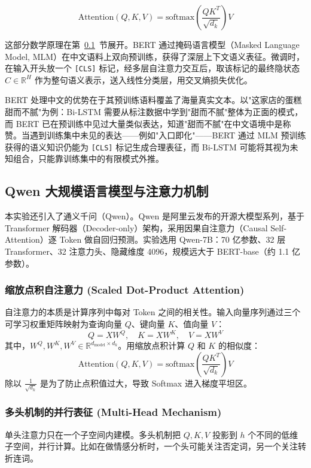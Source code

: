 \begin{equation}
	\text{Attention}(Q, K, V) = \text{softmax}\left(\frac{Q K^T}{\sqrt{d_k}}\right) V
\end{equation}

这部分数学原理在第~\ref{sec:mhsa_mechanism}~节展开。BERT 通过掩码语言模型（Masked Language Model, MLM）在中文语料上双向预训练，获得了深层上下文语义表征。微调时，在输入开头放一个 \texttt{[CLS]} 标记，经多层自注意力交互后，取该标记的最终隐状态 $C \in \mathbb{R}^H$ 作为整句语义表示，送入线性分类层，用交叉熵损失优化。

BERT 处理中文的优势在于其预训练语料覆盖了海量真实文本。以"这家店的蛋糕甜而不腻"为例：Bi-LSTM 需要从标注数据中学到"甜而不腻"整体为正面的模式，而 BERT 已在预训练中见过大量类似表达，知道"甜而不腻"在中文语境中是称赞。当遇到训练集中未见的表达——例如"入口即化"——BERT 通过 MLM 预训练获得的语义知识仍能为 \texttt{[CLS]} 标记生成合理表征，而 Bi-LSTM 可能将其视为未知组合，只能靠训练集中的有限模式外推。

\subsection{Qwen 大规模语言模型与注意力机制}
\label{sec:mhsa_mechanism}

本实验还引入了通义千问（Qwen）。Qwen 是阿里云发布的开源大模型系列，基于 Transformer 解码器（Decoder-only）架构，采用因果自注意力（Causal Self-Attention）逐 Token 做自回归预测。实验选用 Qwen-7B：70 亿参数、32 层 Transformer、32 注意力头、隐藏维度 4096，规模远大于 BERT-base（约 1.1 亿参数）。

\subsubsection{缩放点积自注意力 (Scaled Dot-Product Attention)}
自注意力的本质是计算序列中每对 Token 之间的相关性。输入向量序列通过三个可学习权重矩阵映射为查询向量 $Q$、键向量 $K$、值向量 $V$：
\begin{equation}
	Q = XW^Q, \quad K = XW^K, \quad V = XW^V
\end{equation}
其中，$W^Q, W^K, W^V \in \mathbb{R}^{d_{\text{model}} \times d_k}$。用缩放点积计算 $Q$ 和 $K$ 的相似度：
\begin{equation}
	\text{Attention}(Q, K, V) = \text{softmax}\left(\frac{Q K^T}{\sqrt{d_k}}\right) V
\end{equation}
除以 $\frac{1}{\sqrt{d_k}}$ 是为了防止点积值过大，导致 Softmax 进入梯度平坦区。

\subsubsection{多头机制的并行表征 (Multi-Head Mechanism)}
单头注意力只在一个子空间内建模。多头机制把 $Q, K, V$ 投影到 $h$ 个不同的低维子空间，并行计算。比如在做情感分析时，一个头可能关注否定词，另一个关注转折连词。

